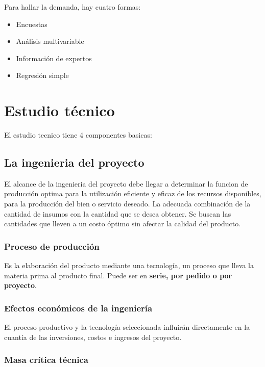 \documentclass[a4paper, 11pt, oneside]{article}
\begin{document}
Para hallar la demanda, hay cuatro formas:

\begin{itemize}
	\item Encuestas
	\item Análisis multivariable
	\item Información de expertos
	\item Regresión simple
\end{itemize}

\section{Estudio técnico}

El estudio tecnico tiene 4 componentes basicas:

\subsection{La ingenieria del proyecto}

El alcance de la ingenieria del proyecto debe llegar a determinar la funcion de producción optima para la utilización eficiente
y eficaz de los recursos disponibles, para la producción del bien o servicio deseado. La adecuada combinación de la cantidad de
insumos con la cantidad que se desea obtener. Se buscan las cantidades que lleven a un costo óptimo sin afectar la calidad
del producto.

\subsubsection{Proceso de producción}

Es la elaboración del producto mediante una tecnología, un proceso que lleva la materia prima al producto 
final. Puede ser en {\bf serie, por pedido o por proyecto}.

\subsubsection{Efectos económicos de la ingeniería}

El proceso productivo y la tecnología seleccionada influirán directamente en la cuantía de las inversiones,
costos e ingresos del proyecto.

\subsubsection{Masa crítica técnica}
\end{document}

